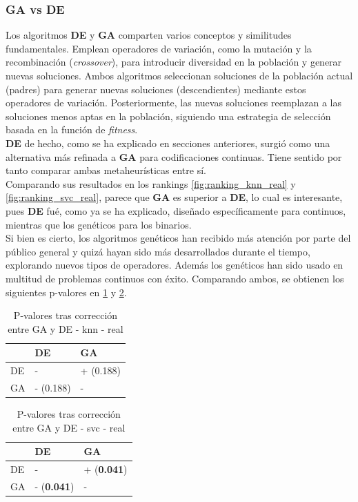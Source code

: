\subsubsection{GA vs DE}
Los algoritmos \textbf{DE} y \textbf{GA} comparten varios conceptos y similitudes fundamentales. Emplean operadores de variación, como la mutación y la recombinación (\textit{crossover}), para introducir diversidad en la población y generar nuevas soluciones. Ambos algoritmos seleccionan soluciones de la población actual (padres) para generar nuevas soluciones (descendientes) mediante estos operadores de variación. Posteriormente, las nuevas soluciones reemplazan a las soluciones menos aptas en la población, siguiendo una estrategia de selección basada en la función de \textit{fitness}.\\[6pt]
\textbf{DE} de hecho, como se ha explicado en secciones anteriores, surgió como una alternativa más refinada a \textbf{GA} para codificaciones continuas. Tiene sentido por tanto comparar ambas metaheurísticas entre sí.\\[6pt]
Comparando sus resultados en los rankings \ref{fig:ranking_knn_real} y \ref{fig:ranking_svc_real}, parece que \textbf{GA} es superior a \textbf{DE}, lo cual es interesante, pues \textbf{DE} fué, como ya se ha explicado, diseñado específicamente para continuos, mientras que los genéticos para los binarios.\\[6pt]
Si bien es cierto, los algoritmos genéticos han recibido más atención por parte del público general y quizá hayan sido más desarrollados durante el tiempo, explorando nuevos tipos de operadores. Además los genéticos han sido usado en multitud de problemas continuos con éxito. Comparando ambos, se obtienen los siguientes p-valores en \ref{tab:pval_corr_ga_de-real_knn} y \ref{tab:pval_corr_ga_de-real_svc}.

\begin{table}[htp]
    \centering
    \begin{tabular}{lll}
        \toprule
        {} & DE        & GA        \\
        \midrule
        DE & -         & + (0.188) \\
        GA & - (0.188) & -         \\
        \bottomrule
    \end{tabular}
    \caption{P-valores tras corrección entre GA y DE - knn - real}
    \label{tab:pval_corr_ga_de-real_knn}
\end{table}

\begin{table}[htp]
    \centering
    \begin{tabular}{lll}
        \toprule
        {} & DE                 & GA                 \\
        \midrule
        DE & -                  & + (\textbf{0.041}) \\
        GA & - (\textbf{0.041}) & -                  \\
        \bottomrule
    \end{tabular}
    \caption{P-valores tras corrección entre GA y DE - svc - real}
    \label{tab:pval_corr_ga_de-real_svc}
\end{table}

